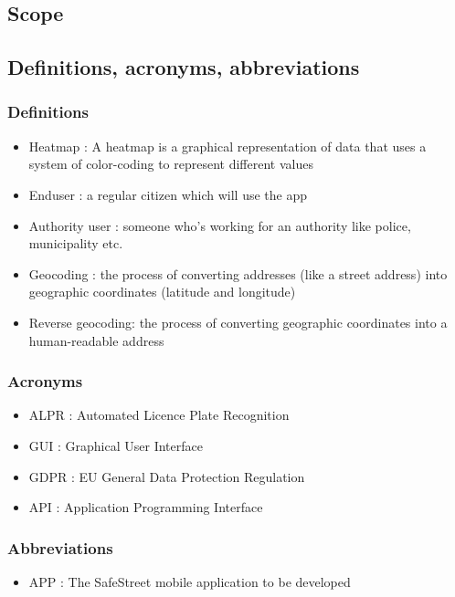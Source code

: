 \subsection{Scope}




\subsection{Definitions,  acronyms,  abbreviations}

\subsubsection{Definitions}
\begin{itemize}
  \item Heatmap : A heatmap is a graphical representation of data that uses a system of color-coding to represent different values
  \item Enduser : a regular citizen which will use the app
  \item Authority user : someone who's working for an authority like police, municipality etc.
  \item Geocoding : the process of converting addresses (like a street address) into geographic coordinates (latitude and longitude)
  \item Reverse geocoding:  the process of converting geographic coordinates into a human-readable address

\end{itemize}

\subsubsection{Acronyms}
\begin{itemize}
  \item ALPR : Automated Licence Plate Recognition
  \item GUI : Graphical User Interface
  \item GDPR : EU General Data Protection Regulation
  \item API : Application Programming Interface
\end{itemize}

\subsubsection{Abbreviations}
\begin{itemize}
  \item APP : The SafeStreet mobile application to be developed
\end{itemize}

